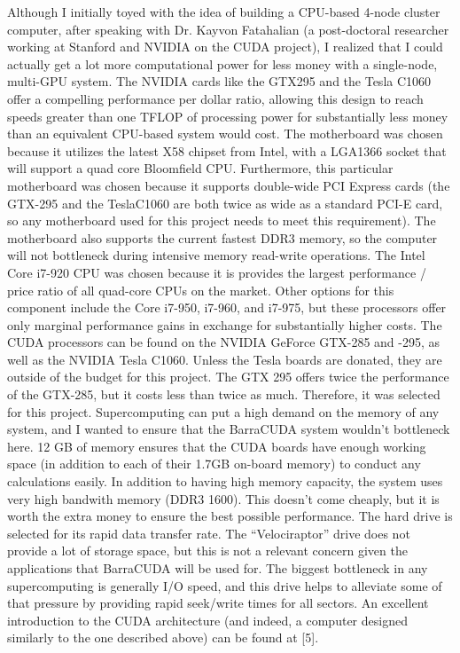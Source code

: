 \documentclass[10pt]{article}
\begin{document}
Although I initially toyed with the idea of building a CPU-based 4-node cluster computer, after speaking with Dr. Kayvon Fatahalian (a post-doctoral researcher working at Stanford and NVIDIA on the CUDA project), I realized that I could actually get a lot more computational power for less money with a single-node, multi-GPU system. The NVIDIA cards like the GTX295 and the Tesla C1060 offer a compelling performance per dollar ratio, allowing this design to reach speeds greater than one TFLOP of processing power for substantially less money than an equivalent CPU-based system would cost. The motherboard was chosen because it utilizes the latest X58 chipset from Intel, with a LGA1366 socket that will support a quad core Bloomfield CPU. Furthermore, this particular motherboard was chosen because it supports double-wide PCI Express cards (the GTX-295 and the TeslaC1060 are both twice as wide as a standard PCI-E card, so any motherboard used for this project needs to meet this requirement). The motherboard also supports the current fastest DDR3 memory, so the computer will not bottleneck during intensive memory read-write operations. The Intel Core i7-920 CPU was chosen because it is provides the largest performance / price ratio of all quad-core CPUs on the market. Other options for this component include the Core i7-950, i7-960, and i7-975, but these  processors offer only marginal performance gains in exchange for substantially higher costs. The CUDA processors can be found on the NVIDIA GeForce GTX-285 and -295, as well as the NVIDIA Tesla C1060. Unless the Tesla boards are donated, they are outside of the budget for this project. The GTX 295 offers twice the performance of the GTX-285, but it costs less than twice as much. Therefore, it was selected for this project. Supercomputing can put a high demand on the memory of any system, and I wanted to ensure that the BarraCUDA system wouldn't bottleneck here. 12 GB of memory ensures that the CUDA boards have enough working space (in addition to each of their 1.7GB on-board memory) to conduct any calculations easily. In addition to having high memory capacity, the system uses very high bandwith memory (DDR3 1600). This doesn't come cheaply, but it is worth the extra money to ensure the best possible performance. The hard drive is selected for its rapid data transfer rate. The ``Velociraptor'' drive does not provide a lot of storage space, but this is not a relevant concern given the applications that BarraCUDA will be used for. The biggest bottleneck in any supercomputing is generally I/O speed, and this drive helps to alleviate some of that pressure by providing rapid seek/write times for all sectors. An excellent introduction to the CUDA architecture (and indeed, a computer designed similarly to the one described above) can be found at [5].
\end{document}
